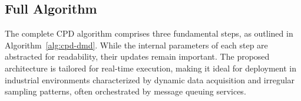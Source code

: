 \subsection{Full Algorithm}
The complete CPD algorithm comprises three fundamental steps, as outlined in Algorithm~\ref{alg:cpd-dmd}. While the internal parameters of each step are abstracted for readability, their updates remain important. The proposed architecture is tailored for real-time execution, making it ideal for deployment in industrial environments characterized by dynamic data acquisition and irregular sampling patterns, often orchestrated by message queuing services.

\begin{algorithm}
	\caption{Single pass of CPD-DMD procedure}\label{alg:cpd-dmd}
	\begin{algorithmic}[1]

	\end{algorithmic}
\end{algorithm}

% 
